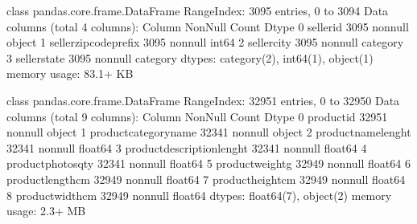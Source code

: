 \documentclass[letterpaper,10pt,english]{jupyterBook}
\begin{document}
\begin{sphinxVerbatim}[commandchars=\\\{\}]
\PYGZlt{}class \PYGZsq{}pandas.core.frame.DataFrame\PYGZsq{}\PYGZgt{}
RangeIndex: 3095 entries, 0 to 3094
Data columns (total 4 columns):
 \PYGZsh{}   Column                  Non\PYGZhy{}Null Count  Dtype   
\PYGZhy{}\PYGZhy{}\PYGZhy{}  \PYGZhy{}\PYGZhy{}\PYGZhy{}\PYGZhy{}\PYGZhy{}\PYGZhy{}                  \PYGZhy{}\PYGZhy{}\PYGZhy{}\PYGZhy{}\PYGZhy{}\PYGZhy{}\PYGZhy{}\PYGZhy{}\PYGZhy{}\PYGZhy{}\PYGZhy{}\PYGZhy{}\PYGZhy{}\PYGZhy{}  \PYGZhy{}\PYGZhy{}\PYGZhy{}\PYGZhy{}\PYGZhy{}   
 0   seller\PYGZus{}id               3095 non\PYGZhy{}null   object  
 1   seller\PYGZus{}zip\PYGZus{}code\PYGZus{}prefix  3095 non\PYGZhy{}null   int64   
 2   seller\PYGZus{}city             3095 non\PYGZhy{}null   category
 3   seller\PYGZus{}state            3095 non\PYGZhy{}null   category
dtypes: category(2), int64(1), object(1)
memory usage: 83.1+ KB
\end{sphinxVerbatim}

\begin{sphinxVerbatim}[commandchars=\\\{\}]
\end{sphinxVerbatim}

\begin{sphinxVerbatim}[commandchars=\\\{\}]
\PYGZlt{}class \PYGZsq{}pandas.core.frame.DataFrame\PYGZsq{}\PYGZgt{}
RangeIndex: 32951 entries, 0 to 32950
Data columns (total 9 columns):
 \PYGZsh{}   Column                      Non\PYGZhy{}Null Count  Dtype  
\PYGZhy{}\PYGZhy{}\PYGZhy{}  \PYGZhy{}\PYGZhy{}\PYGZhy{}\PYGZhy{}\PYGZhy{}\PYGZhy{}                      \PYGZhy{}\PYGZhy{}\PYGZhy{}\PYGZhy{}\PYGZhy{}\PYGZhy{}\PYGZhy{}\PYGZhy{}\PYGZhy{}\PYGZhy{}\PYGZhy{}\PYGZhy{}\PYGZhy{}\PYGZhy{}  \PYGZhy{}\PYGZhy{}\PYGZhy{}\PYGZhy{}\PYGZhy{}  
 0   product\PYGZus{}id                  32951 non\PYGZhy{}null  object 
 1   product\PYGZus{}category\PYGZus{}name       32341 non\PYGZhy{}null  object 
 2   product\PYGZus{}name\PYGZus{}lenght         32341 non\PYGZhy{}null  float64
 3   product\PYGZus{}description\PYGZus{}lenght  32341 non\PYGZhy{}null  float64
 4   product\PYGZus{}photos\PYGZus{}qty          32341 non\PYGZhy{}null  float64
 5   product\PYGZus{}weight\PYGZus{}g            32949 non\PYGZhy{}null  float64
 6   product\PYGZus{}length\PYGZus{}cm           32949 non\PYGZhy{}null  float64
 7   product\PYGZus{}height\PYGZus{}cm           32949 non\PYGZhy{}null  float64
 8   product\PYGZus{}width\PYGZus{}cm            32949 non\PYGZhy{}null  float64
dtypes: float64(7), object(2)
memory usage: 2.3+ MB
\end{sphinxVerbatim}
\end{document}
